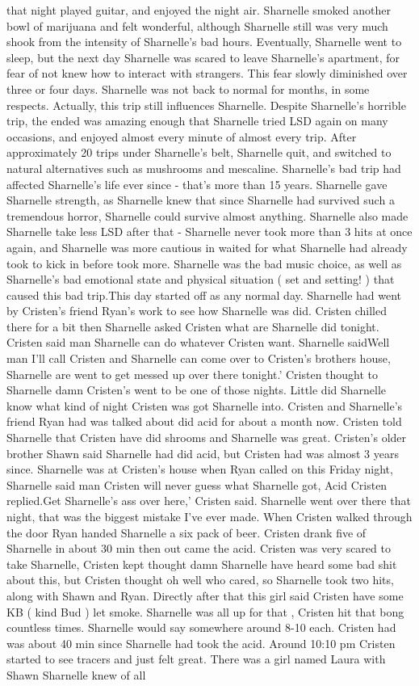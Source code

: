 \documentclass[12pt]{book}
\begin{document}
that night played guitar, and enjoyed the night air. Sharnelle smoked another bowl of marijuana and felt wonderful, although Sharnelle still was very much shook from the intensity of Sharnelle's bad hours. Eventually, Sharnelle went to sleep, but the next day Sharnelle was scared to leave Sharnelle's apartment, for fear of not knew how to interact with strangers. This fear slowly diminished over three or four days. Sharnelle was not back to normal for months, in some respects. Actually, this trip still influences Sharnelle. Despite Sharnelle's horrible trip, the ended was amazing enough that Sharnelle tried LSD again on many occasions, and enjoyed almost every minute of almost every trip. After approximately 20 trips under Sharnelle's belt, Sharnelle quit, and switched to natural alternatives such as mushrooms and mescaline. Sharnelle's bad trip had affected Sharnelle's life ever since - that's more than 15 years. Sharnelle gave Sharnelle strength, as Sharnelle knew that since Sharnelle had survived such a tremendous horror, Sharnelle could survive almost anything. Sharnelle also made Sharnelle take less LSD after that - Sharnelle never took more than 3 hits at once again, and Sharnelle was more cautious in waited for what Sharnelle had already took to kick in before took more. Sharnelle was the bad music choice, as well as Sharnelle's bad emotional state and physical situation ( set and setting! ) that caused this bad trip.This day started off as any normal day. Sharnelle had went by Cristen's friend Ryan's work to see how Sharnelle was did. Cristen chilled there for a bit then Sharnelle asked Cristen what are Sharnelle did tonight. Cristen said man Sharnelle can do whatever Cristen want. Sharnelle saidWell man I'll call Cristen and Sharnelle can come over to Cristen's brothers house, Sharnelle are went to get messed up over there tonight.' Cristen thought to Sharnelle damn Cristen's went to be one of those nights. Little did Sharnelle know what kind of night Cristen was got Sharnelle into. Cristen and Sharnelle's friend Ryan had was talked about did acid for about a month now. Cristen told Sharnelle that Cristen have did shrooms and Sharnelle was great. Cristen's older brother Shawn said Sharnelle had did acid, but Cristen had was almost 3 years since. Sharnelle was at Cristen's house when Ryan called on this Friday night, Sharnelle said man Cristen will never guess what Sharnelle got, Acid Cristen replied.Get Sharnelle's ass over here,' Cristen said. Sharnelle went over there that night, that was the biggest mistake I've ever made. When Cristen walked through the door Ryan handed Sharnelle a six pack of beer. Cristen drank five of Sharnelle in about 30 min then out came the acid. Cristen was very scared to take Sharnelle, Cristen kept thought damn Sharnelle have heard some bad shit about this, but Cristen thought oh well who cared, so Sharnelle took two hits, along with Shawn and Ryan. Directly after that this girl said Cristen have some KB ( kind Bud ) let smoke. Sharnelle was all up for that , Cristen hit that bong countless times. Sharnelle would say somewhere around 8-10 each. Cristen had was about 40 min since Sharnelle had took the acid. Around 10:10 pm Cristen started to see tracers and just felt great. There was a girl named Laura with Shawn Sharnelle knew of all 
\end{document}
